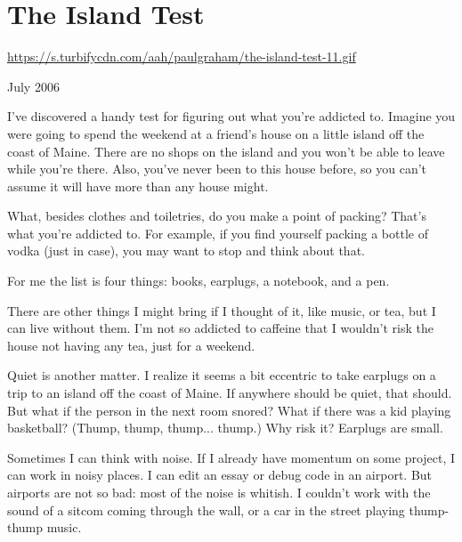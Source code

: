 \chapter{The Island Test}


            
              
                \href{https://s.turbifycdn.com/aah/paulgraham/the-island-test-11.gif}{https://s.turbifycdn.com/aah/paulgraham/the-island-test-11.gif}



July 2006

I've discovered a handy test for
                  figuring out what you're addicted to. Imagine you were going
                  to spend the weekend at a friend's house on a little island
                  off the coast of Maine. There are no shops on the island and
                  you won't be able to leave while you're there. Also, you've
                  never been to this house before, so you can't assume it will
                  have more than any house might.

What, besides
                  clothes and toiletries, do you make a point of packing? That's
                  what you're addicted to. For example, if you find yourself
                  packing a bottle of vodka (just in case), you may want to stop
                  and think about that.

For me the list is four
                  things: books, earplugs, a notebook, and a pen.

There
                  are other things I might bring if I thought of it, like music,
                  or tea, but I can live without them. I'm not so addicted to
                  caffeine that I wouldn't risk the house not having any tea,
                  just for a weekend.

Quiet is another matter. I
                  realize it seems a bit eccentric to take earplugs on a trip to
                  an island off the coast of Maine. If anywhere should be quiet,
                  that should. But what if the person in the next room snored?
                  What if there was a kid playing basketball? (Thump, thump,
                  thump... thump.) Why risk it? Earplugs are small.

Sometimes
                  I can think with noise. If I already have momentum on some
                  project, I can work in noisy places. I can edit an essay or
                  debug code in an airport. But airports are not so bad: most of
                  the noise is whitish. I couldn't work with the sound of a
                  sitcom coming through the wall, or a car in the street playing
                  thump-thump music.

